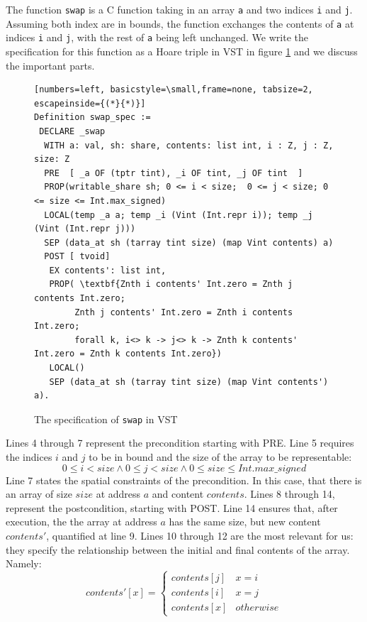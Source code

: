 \documentclass[onecolumn, preprint]{sigplanconf}
\begin{document}
The function \texttt{swap} is a C function taking in an array \texttt{a} and two indices \texttt{i} and \texttt{j}. Assuming both index are in bounds, the function exchanges the contents of \texttt{a} at indices \texttt{i} and \texttt{j}, with the rest of \texttt{a} being left unchanged. We write the specification for this function as a Hoare triple in VST in figure \ref{fig:hoarswap} and we discuss the important parts.

\begin{figure}
\begin{lstlisting}[numbers=left, basicstyle=\small,frame=none, tabsize=2, escapeinside={(*}{*)}]  
Definition swap_spec :=
 DECLARE _swap
  WITH a: val, sh: share, contents: list int, i : Z, j : Z, size: Z
  PRE  [ _a OF (tptr tint), _i OF tint, _j OF tint  ]
  PROP(writable_share sh; 0 <= i < size;  0 <= j < size; 0 <= size <= Int.max_signed)
  LOCAL(temp _a a; temp _i (Vint (Int.repr i)); temp _j (Vint (Int.repr j)))
  SEP (data_at sh (tarray tint size) (map Vint contents) a)
  POST [ tvoid]
   EX contents': list int,
   PROP( \textbf{Znth i contents' Int.zero = Znth j contents Int.zero;
        Znth j contents' Int.zero = Znth i contents Int.zero;
        forall k, i<> k -> j<> k -> Znth k contents' Int.zero = Znth k contents Int.zero})
   LOCAL()
   SEP (data_at sh (tarray tint size) (map Vint contents') a).
\end{lstlisting}
\label{fig:hoarswap}
   \caption{The specification of \texttt{swap} in VST}
\end{figure}
Lines 4 through 7 represent the precondition starting with PRE. Line 5 requires the indices $i$ and $j$ to be in bound and the size of the array to be representable:
$$ 0 \leq i < size \wedge 0 \leq j < size  \wedge 0 \leq size \leq Int.max\_signed $$
Line 7 states the spatial constraints of the precondition. In this case, that there is an array of size $size$ at address $a$ and content $contents$. Lines 8 through 14, represent the postcondition, starting with POST. Line 14 ensures that, after execution, the the array at address $a$ has the same size, but new content $contents'$, quantified at line 9. Lines 10 through 12 are the most relevant for us: they specify the relationship between the initial and final contents of the array. Namely:
$$contents'[x] = \left\{\begin{array}{cc}contents[j] & x = i \\contents[i] & x = j \\contents[x] & otherwise\end{array}\right.$$
\end{document}

